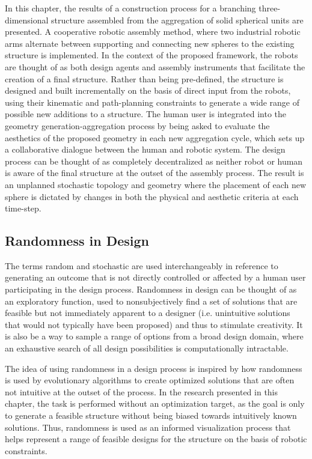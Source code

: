     In this chapter, the results of a construction process for a branching three-dimensional structure assembled from the aggregation of solid spherical units are presented. A cooperative robotic assembly method, where two industrial robotic arms alternate between supporting and connecting new spheres to the existing structure is implemented. In the context of the proposed framework, the robots are thought of as both design agents and assembly instruments that facilitate the creation of a final structure. Rather than being pre-defined, the structure is designed and built incrementally on the basis of direct input from the robots, using their kinematic and path-planning constraints to generate a wide range of possible new additions to a structure. The human user is integrated into the geometry generation-aggregation process by being asked to evaluate the aesthetics of the proposed geometry in each new aggregation cycle, which sets up a collaborative dialogue between the human and robotic system. The design process can be thought of as completely decentralized as neither robot or human is aware of the final structure at the outset of the assembly process. The result is an unplanned stochastic topology and geometry where the placement of each new sphere is dictated by changes in both the physical and aesthetic criteria at each time-step.
    
    \subsection{Randomness in Design}
        The terms random and stochastic are used interchangeably in reference to generating an outcome that is not directly controlled or affected by a human user participating in the design process. Randomness in design can be thought of as an exploratory function, used to nonsubjectively find a set of solutions that are feasible but not immediately apparent to a designer (i.e. unintuitive solutions that would not typically have been proposed) and thus to stimulate creativity. It is also be a way to sample a range of options from a broad design domain, where an exhaustive search of all design possibilities is computationally intractable.
        
        The idea of using randomness in a design process is inspired by how randomness is used by evolutionary algorithms to create optimized solutions that are often not intuitive at the outset of the process. In the research presented in this chapter, the task is performed without an optimization target, as the goal is only to generate a feasible structure without being biased towards intuitively known solutions. Thus, randomness is used as an informed visualization process that helps represent a range of feasible designs for the structure on the basis of robotic constraints.
    
